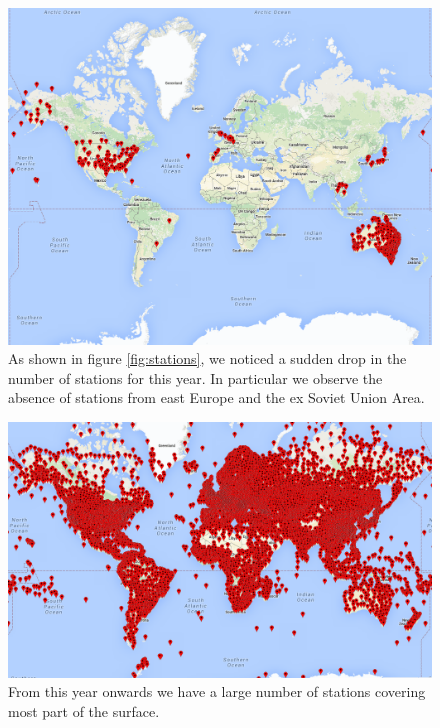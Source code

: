 \documentclass{vldb}
\begin{document}
\begin{figure}[tbh]
\includegraphics[width=1\linewidth]{stations1972}
\caption{As shown in figure \ref{fig:stations}, we noticed a sudden drop in the number of stations for this year. In particular we observe the absence of stations from east Europe and the ex Soviet Union Area.}
\label{fig:stations1972}
\end{figure}

\begin{figure}[tbh]
\includegraphics[width=1\linewidth]{stations1980}
\caption{From this year onwards we have a large number of stations covering most part of the surface.}
\label{fig:stations1980}
\end{figure}
\end{document}
